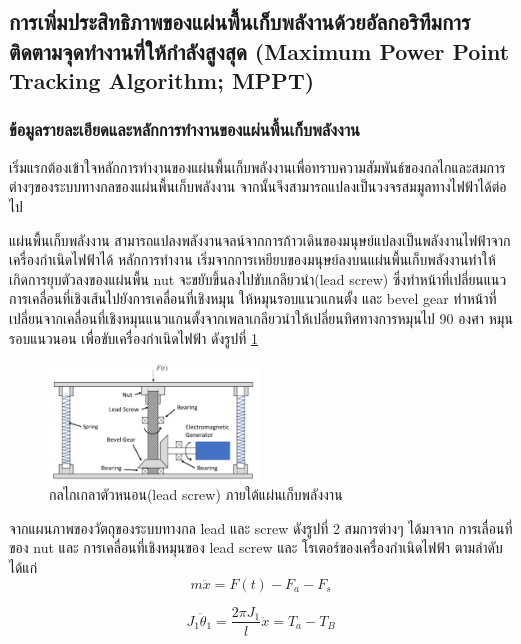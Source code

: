 \documentclass[11pt,a4paper]{article}
\begin{document}
\subsection{การเพิ่มประสิทธิภาพของแผ่นพื้นเก็บพลังานด้วยอัลกอริทึมการติดตามจุดทำงานที่ให้กำลังสูงสุด (Maximum Power Point Tracking Algorithm; MPPT)}
\subsubsection{ข้อมูลรายละเอียดและหลักการทำงานของแผ่นพื้นเก็บพลังงาน}
เริ่มแรกต้องเข้าใจหลักการทำงานของแผ่นพื้นเก็บพลังงานเพื่อทราบความสัมพันธ์ของกลไกและสมการต่างๆของระบบทางกลของแผ่นพื้นเก็บพลังงาน จากนั้นจึงสามารถแปลงเป็นวงจรสมมูลทางไฟฟ้าได้ต่อไป

แผ่นพื้นเก็บพลังงาน สามารถแปลงพลังงานจลน์จากการก้าวเดินของมนุษย์แปลงเป็นพลังงานไฟฟ้าจากเครื่องกำเนิดไฟฟ้าได้ หลักการทำงาน เริ่มจากการเหยียบของมนุษย์ลงบนแผ่นพื้นเก็บพลังงานทำให้เกิดการยุบตัวลงของแผ่นพื้น nut จะขยับขึ้นลงไปขับเกลียวนำ(lead screw) ซึ่งทำหน้าที่เปลี่ยนแนวการเคลื่อนที่เชิงเส้นไปยังการเคลื่อนที่เชิงหมุน ให้หมุนรอบแนวแกนตั้ง และ bevel gear ทำหน้าที่เปลี่ยนจากเคลื่อนที่เชิงหมุนแนวแกนตั้งจากเพลาเกลียวนำให้เปลี่ยนทิศทางการหมุนไป 90 องศา หมุนรอบแนวนอน เพื่อขับเครื่องกำเนิดไฟฟ้า ดังรูปที่ \ref{lead-screw_lx}

\begin{figure}[h!]
    \begin{center}
        \includegraphics[width=0.5\textwidth]{lead-screw_lx.png}
    \end{center}
    \caption{กลไกเกลาตัวหนอน(lead screw) ภายใต้แผ่นเก็บพลังงาน}
    \label{lead-screw_lx}
\end{figure}

จากแผนภาพของวัตถุของระบบทางกล lead และ screw ดังรูปที่ 2 สมการต่างๆ ได้มาจาก การเลื่อนที่ของ nut และ การเคลื่อนที่เชิงหมุนของ lead screw และ โรเตอร์ของเครื่องกำเนิดไฟฟ้า ตามลำดับ ได้แก่
\newpage
\begin{equation}
    m\ddot{x} = F(t)-F_{a}-F_{s}
\end{equation}

\begin{equation}
    J_{1}\ddot{\theta}_{1} = \frac{2\pi J_{1}}{l}\ddot{x} = T_{a}-T_{B}
\end{equation}
\end{document}
